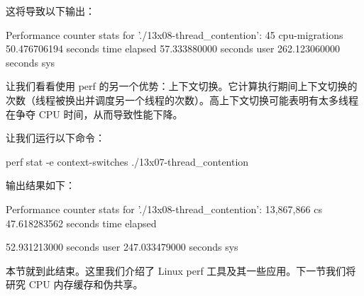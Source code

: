 这将导致以下输出：

\begin{shell}
Performance counter stats for './13x08-thread_contention':
            45         cpu-migrations
  50.476706194     seconds time elapsed
  57.333880000 seconds user
 262.123060000 seconds sys
\end{shell}

让我们看看使用 perf 的另一个优势：上下文切换。它计算执行期间上下文切换的次数（线程被换出并调度另一个线程的次数）。高上下文切换可能表明有太多线程在争夺 CPU 时间，从而导致性能下降。

让我们运行以下命令：

\begin{shell}
perf stat -e context-switches ./13x07-thread_contention
\end{shell}

输出结果如下：

\begin{shell}
Performance counter stats for './13x08-thread_contention':
     13,867,866     cs
   47.618283562 seconds time elapsed

   52.931213000 seconds user
  247.033479000 seconds sys
\end{shell}

本节就到此结束。这里我们介绍了 Linux perf 工具及其一些应用。下一节我们将研究 CPU 内存缓存和伪共享。
















